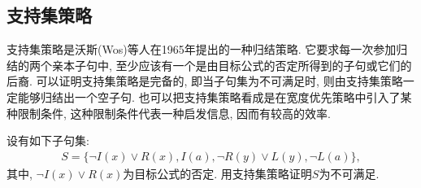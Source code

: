 \subsection{支持集策略}
 支持集策略是沃斯(Wos)等人在1965年提出的一种归结策略. 它要求每一次参加归结的两个亲本子句中, 至少应该有一个是由目标公式的否定所得到的子句或它们的后裔.
 可以证明支持集策略是完备的, 即当子句集为不可满足时, 则由支持集策略一定能够归结出一个空子句.
 也可以把支持集策略看成是在宽度优先策略中引入了某种限制条件, 这种限制条件代表一种启发信息, 因而有较高的效率.
\begin{example}
设有如下子句集:
\begin{align}
  S=\{\neg I(x)\vee R(x),  I(a),\neg  R(y)\vee L(y), \neg L(a)\},
\end{align}
其中, $\neg I(x)\vee R(x)$为目标公式的否定. 用支持集策略证明$S$为不可满足.
\end{example}
